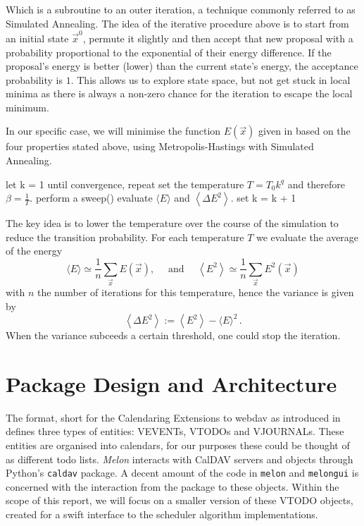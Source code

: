 \documentclass{prettytex/ox/mmsc-special-topic}
\begin{document}
  Which is a subroutine to an outer iteration, a technique commonly referred to as Simulated Annealing.
  The idea of the iterative procedure above is to start from an initial state $\vec{x}^0$, permute it slightly and then accept that new proposal with a probability proportional to the exponential of their energy difference.
  If the proposal's energy is better (lower) than the current state's energy, the acceptance probability is $1$.
  This allows us to explore state space, but not get stuck in local minima as there is always a non-zero chance for the iteration to escape the local minimum.

  In our specific case, we will minimise the function $E(\vec{x})$ given in  based on the four properties stated above, using Metropolis-Hastings with Simulated Annealing.

  \begin{algorithm}[language=pseudo,caption={\centering Simulated Annealing},basicstyle=\footnotesize]
let k = 1
until convergence, repeat
  set the temperature $T = T_0 k^{q}$ and therefore $\beta = \frac{1}{T}$.
  perform a sweep()
  evaluate $\langle E\rangle$ and $\left\langle\Delta E^2\right\rangle$.
  set k = k + 1
  \end{algorithm}

  The key idea is to lower the temperature over the course of the simulation to reduce the transition probability.
  For each temperature $T$ we evaluate the average of the energy
  $$\langle E\rangle \simeq \frac{1}{n} \sum_{\vec{x}} E(\vec{x}), \quad \text { and } \quad\left\langle E^2\right\rangle \simeq \frac{1}{n} \sum_{\vec{x}} E^2(\vec{x})$$
  with $n$ the number of iterations for this temperature, hence the variance is given by
  $$\left\langle\Delta E^2\right\rangle:=\left\langle E^2\right\rangle-\langle E\rangle^2 \,.$$
  When the variance subceeds a certain threshold, one could stop the iteration.

  \section{Package Design and Architecture}
  The  format, short for the Calendaring Extensions to \gls{webdav} as introduced in \cite{caldav-rfc} defines three types of entities: VEVENTs, VTODOs and VJOURNALs.
  These entities are organised into calendars, for our purposes these could be thought of as different todo lists.
  \textit{Melon} interacts with CalDAV servers and objects through Python's \texttt{caldav} package.
  A decent amount of the code in \texttt{melon} and \texttt{melongui} is concerned with the interaction from the package to these objects.
  Within the scope of this report, we will focus on a smaller version of these VTODO objects, created for a swift interface to the scheduler algorithm implementations.
\end{document}

